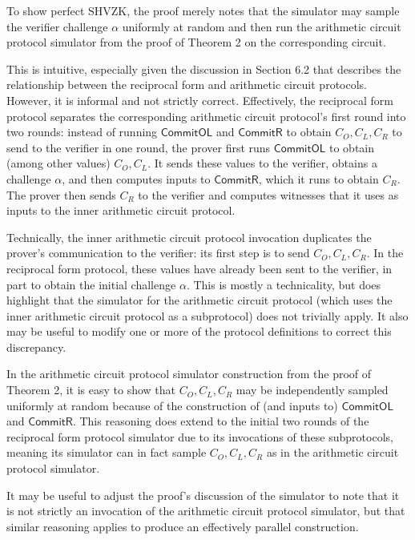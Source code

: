 \documentclass{article}
\begin{document}
To show perfect SHVZK, the proof merely notes that the simulator may sample the verifier challenge $\alpha$ uniformly at random and then run the arithmetic circuit protocol simulator from the proof of Theorem 2 on the corresponding circuit.

This is intuitive, especially given the discussion in Section 6.2 that describes the relationship between the reciprocal form and arithmetic circuit protocols.
However, it is informal and not strictly correct.
Effectively, the reciprocal form protocol separates the corresponding arithmetic circuit protocol's first round into two rounds: instead of running $\mathsf{CommitOL}$ and $\mathsf{CommitR}$ to obtain $C_O, C_L, C_R$ to send to the verifier in one round, the prover first runs $\mathsf{CommitOL}$ to obtain (among other values) $C_O, C_L$.
It sends these values to the verifier, obtains a challenge $\alpha$, and then computes inputs to $\mathsf{CommitR}$, which it runs to obtain $C_R$.
The prover then sends $C_R$ to the verifier and computes witnesses that it uses as inputs to the inner arithmetic circuit protocol.

Technically, the inner arithmetic circuit protocol invocation duplicates the prover's communication to the verifier: its first step is to send $C_O, C_L, C_R$.
In the reciprocal form protocol, these values have already been sent to the verifier, in part to obtain the initial challenge $\alpha$.
This is mostly a technicality, but does highlight that the simulator for the arithmetic circuit protocol (which uses the inner arithmetic circuit protocol as a subprotocol) does not trivially apply.
It also may be useful to modify one or more of the protocol definitions to correct this discrepancy.

In the arithmetic circuit protocol simulator construction from the proof of Theorem 2, it is easy to show that $C_O, C_L, C_R$ may be independently sampled uniformly at random because of the construction of (and inputs to) $\mathsf{CommitOL}$ and $\mathsf{CommitR}$.
This reasoning does extend to the initial two rounds of the reciprocal form protocol simulator due to its invocations of these subprotocols, meaning its simulator can in fact sample $C_O, C_L, C_R$ as in the arithmetic circuit protocol simulator.

It may be useful to adjust the proof's discussion of the simulator to note that it is not strictly an invocation of the arithmetic circuit protocol simulator, but that similar reasoning applies to produce an effectively parallel construction.
\end{document}
